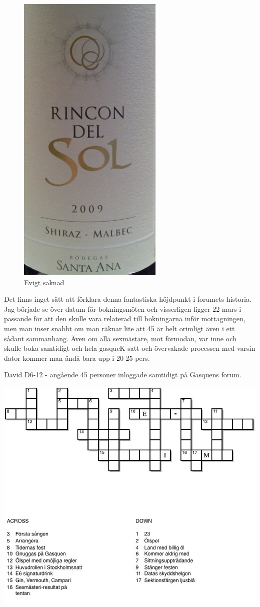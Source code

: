 \documentclass[11pt, a4paper]{memoir} %
\begin{document}
\begin{figure}[!ht]
  \caption{Evigt saknad}
  \centering
    \includegraphics{rincon}
\end{figure}

\epigraph{Det finns inget sätt att förklara denna fantastiska höjdpunkt i forumets historia. Jag började se över datum för bokningsmöten och visserligen ligger 22 mars i passande för att den skulle vara relaterad till bokningarna inför mottagningen, men man inser snabbt om man räknar lite att 45 är helt orimligt även i ett sådant sammanhang. Även om alla sexmästare, mot förmodan, var inne och skulle boka samtidigt och hela gasqueK satt och övervakade processen med varsin dator kommer man ändå bara upp i 20-25 pers.}{David D6-12 - angående 45 personer inloggade samtidigt på Gasquens forum.}

\newpage
\restoregeometry
\onecolumn

\centering
    \includegraphics[width=\textwidth]{korsord}
\end{document}
